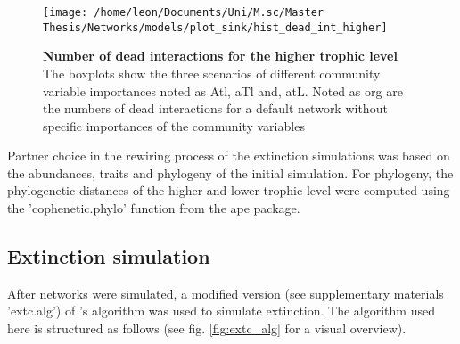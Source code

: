 \documentclass[12pt,a4paper]{article}
\begin{document}
\begin{figure}[H]
	 \texttt{[image: /home/leon/Documents/Uni/M.sc/Master Thesis/Networks/models/plot\_sink/hist\_dead\_int\_higher]}
	 \caption{\textbf{Number of dead interactions for the higher trophic level} The boxplots show the three scenarios of different community variable importances noted as Atl, aTl and, atL. Noted as org are the numbers of dead interactions for a default network without specific importances of the community variables}
	 \label{dead_int_high}
\end{figure}



	Partner choice in the rewiring process of the extinction simulations was based on the abundances, traits and phylogeny of the initial simulation. For phylogeny, the phylogenetic distances of the higher and lower trophic level were computed using the 'cophenetic.phylo' function from the ape package.
	\subsection{Extinction simulation} \label{sec:extc_sim}
	After networks were simulated, a modified version (see supplementary materials 'extc.alg') of \citeauthor{vizentin-bugoni2019}'s algorithm was used to simulate extinction. The algorithm used here is structured as follows (see fig. \ref{fig:extc_alg} for a visual overview).
\end{document}
